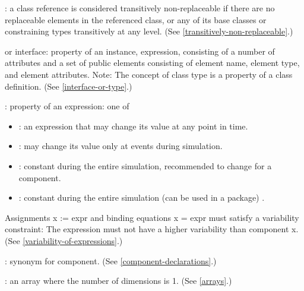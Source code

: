 : a class reference is considered
transitively non-replaceable if there are no replaceable elements in the
referenced class, or any of its base classes or constraining types
transitively at any level. (See \autoref{transitively-non-replaceable}.)

 or interface: property of an instance, expression, consisting of a number of attributes and a set of public
elements consisting of element name, element type, and element
attributes. Note: The concept of class type is a property of a class
definition. (See \autoref{interface-or-type}.)

: property of an expression: one of
\begin{itemize}
\item {}: an expression that may change its value at any
point in time.
\item {}: may change its value only at events during
simulation.
\item {}: constant during the entire simulation, recommended
to change for a component.
\item {}: constant during the entire simulation (can be used
in a package) .
\end{itemize}

Assignments x := expr and binding equations x = expr must satisfy a
variability constraint: The expression must not have a higher
variability than component x. (See \autoref{variability-of-expressions}.)

: synonym for component. (See \autoref{component-declarations}.)

: an array where the number of dimensions is 1. (See
\autoref{arrays}.)
